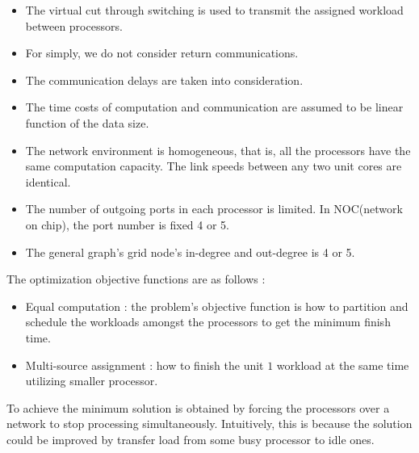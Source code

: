 \begin{itemize}
\item The virtual cut through \cite{kermani1979virtual} switching is used to transmit the assigned workload between processors.
\item For simply, we do not consider return communications.  
\item The communication delays are taken into consideration.  
\item The time costs of computation and communication are assumed to be linear function of the data size.  
\item The network environment is homogeneous, that is, all the processors have the same computation capacity.  The link speeds between any two unit cores are identical.   
\item The number of outgoing ports in each processor is limited.  In NOC(network on chip), the port number is fixed 4 or 5.  
\item The general graph's grid node's in-degree and out-degree is 4 or 5.  
\end{itemize}

The optimization objective functions are as follows :
\begin{itemize}
\item Equal computation : the problem's objective function is how to partition and schedule the workloads amongst the processors to get the minimum finish time.  
\item Multi-source assignment : how to finish the unit $1$ workload at the same time utilizing smaller processor.
\end{itemize}

To achieve the minimum solution is obtained by forcing the processors over a network to stop processing simultaneously.  Intuitively, this is because the solution could be improved by transfer load from some busy processor to idle ones.  


